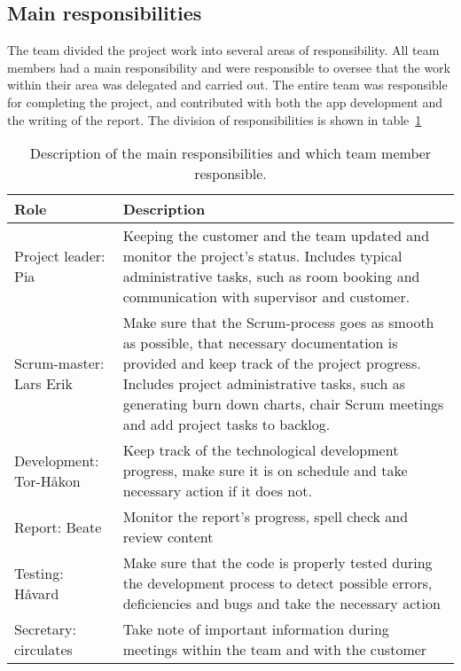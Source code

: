 \newpage
\subsection{Main responsibilities}

The team divided the project work into several areas of responsibility. All team members had a main responsibility and were responsible to oversee that the work within their area was delegated and carried out. The entire team was responsible for completing the project, and contributed with both the app development and the writing of the report. The division of responsibilities is shown in table~\ref{tab:mainResponsibilities}


\begin{table}[H]
\centering
{}
\begin{tabular}{|l|p{9.7cm}|}
\hline
\textbf{Role} & \textbf{Description}\\\hline
Project leader: Pia & Keeping the customer and the team updated and monitor the project's status. Includes typical administrative tasks, such as room booking and communication with supervisor and customer.\\\hline
Scrum-master: Lars Erik & Make sure that the Scrum-process goes as smooth as possible, that necessary documentation is provided and keep track of the project progress. Includes project administrative tasks, such as generating burn down charts, chair Scrum meetings and add project tasks to backlog.\\\hline
Development: Tor-Håkon & Keep track of the technological development progress, make sure it is on schedule and take necessary action if it does not.\\\hline
Report: Beate & Monitor the report's progress, spell check and review content\\\hline
Testing: Håvard & Make sure that the code is properly tested during the development process to detect possible errors, deficiencies and bugs and take the necessary action \\\hline
Secretary: circulates & Take note of important information during meetings within the team and with the customer\\\hline
\end{tabular}
\caption{Description of the main responsibilities and which team member responsible.}
\label{tab:mainResponsibilities}
\end{table}
